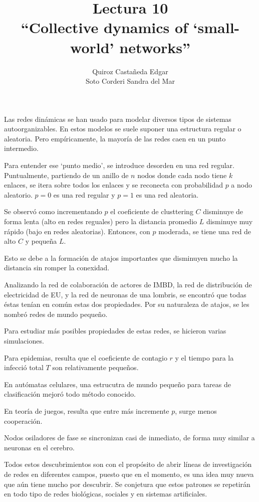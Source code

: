 \documentclass[12pt]{article}
\title{
	Lectura 10\\ 
	``Collective dynamics of `small-world' networks''
	}
\author{
	Quiroz Castañeda Edgar \\
	Soto Corderi Sandra del Mar
	}
\makeatletter
\renewcommand{\maketitle}{
	\bgroup\setlength{\parindent}{0pt}

	\begin{flushright}
		\@author
	\end{flushright}

	\begin{flushleft}
		\textbf{\@title}
	\end{flushleft}

	\egroup
}
\makeatother
\begin{document}
	\maketitle
	
	Las redes dinámicas se han usado para modelar diversos tipos de sistemas 
	autoorganizables. En estos modelos se suele suponer una estructura regular o
	aleatoria. Pero empíricamente, la mayoría de las redes caen en un punto 
	intermedio. 
	
	Para entender ese `punto medio', se introduce desorden en una red regular.
	Puntualmente, partiendo de un anillo de $n$ nodos donde cada nodo tiene $k$
	enlaces, se itera sobre todos los enlaces y se reconecta con probabilidad 
	$p$ a nodo aleatorio. $p = 0$ es una red regular y $p = 1$ es una red 
	aleatoria.

	Se observó como incrementando $p$ el coeficiente de clusttering $C$ 
	disminuye de forma lenta (alto en redes reguales) pero la distancia promedio
	$L$ disminuye muy rápido (bajo en redes aleatorias). Entonces, con $p$ 
	moderada, se tiene una red de alto $C$ y pequeña $L$.

	Esto se debe a la formación de atajos importantes que disminuyen mucho la 
	distancia sin romper la conexidad.
	
	Analizando la red de colaboración de actores de IMBD, la red de distribución 
	de electricidad de EU, y la red de neuronas de una lombris, se encontró que 
	todas éstas tenían en común estas dos propiedades. Por su naturaleza de
	atajos, se les nombró redes de mundo pequeño.

	Para estudiar más posibles propiedades de estas redes, se hicieron varias 
	simulaciones.

	Para epidemias, resulta que el coeficiente de contagio $r$ y el tiempo para 
	la infecció total $T$ son relativamente pequeños.

	En autómatas celulares, una estrucutra de mundo pequeño para tareas de 
	clasificación mejoró todo método conocido.

	En teoría de juegos, resulta que entre más incremente $p$, surge menos 
	cooperación.

	Nodos osiladores de fase se sincronizan casi de inmediato, de forma muy 
	similar a neuronas en el cerebro.

	Todos estos descubrimientos son con el propósito de abrir líneas de 
	investigación de redes en diferentes campos, puesto que en el momento, es 
	una idea muy nueva que aún tiene mucho por descubrir. Se conjetura que estos
	patrones se repetirán en todo tipo de redes biológicas, sociales y en 
	sistemas artificiales.
\end{document}
